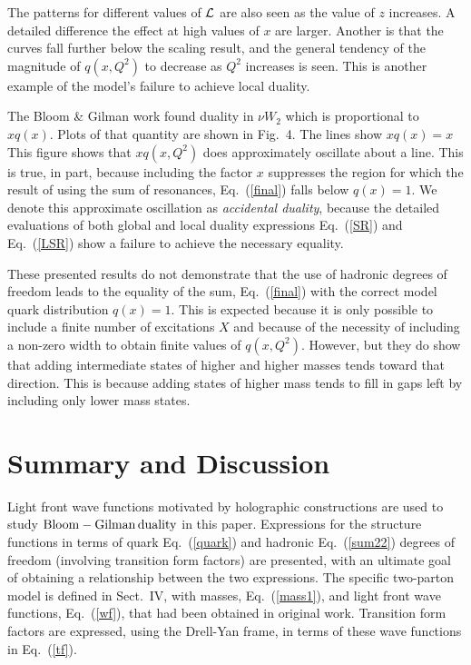 \documentclass[aps,prd,amsmath,longbibliography]{revtex4-1}
\newcommand{\eq}[1]{Eq.~(\ref{#1})}
\def\BGs{\rm Bloom-Gilman\,duality}
\begin{document}
{ The patterns for different values of ${\cal L}$ are  also seen as the value of $z$ increases. A detailed difference  the effect at high values of $x$ are larger. Another is that the curves fall further below the scaling result, and  the general tendency of the magnitude of $q(x,Q^2)$ to decrease as $Q^2$ increases is seen. This is another example of the model's failure to achieve local duality.

The  Bloom \& Gilman work found duality in $\nu W_2$ which is proportional to $xq(x)$. Plots of that quantity are shown in Fig.~4. The lines show $x q(x)=x $  This figure shows that $x q(x,Q^2)$ does approximately oscillate about a line. This is true, in part, because including  the factor $x$ suppresses the region for which the result of using the sum of resonances, \eq{final} falls below $q(x)=1$.
We denote this   approximate oscillation  as {\it accidental duality}, because the detailed evaluations of both global and local duality expressions \eq{SR} and \eq{LSR} show a failure to achieve the necessary equality.
 
These  presented results do not  demonstrate that the use of hadronic degrees of freedom leads  to the equality of the sum, \eq{final} with the correct model quark distribution $q(x)=1$. This is expected because it is only  possible to include a finite number of excitations $X$ and because of the necessity of including a non-zero width to obtain finite values of $q(x,Q^2)$.  However,  but they do show that adding intermediate states of higher and higher masses tends toward that direction. This is because adding  states of higher mass tends to fill in gaps left by including only lower mass states. 
% 
\section{Summary and Discussion}

Light front wave functions motivated by holographic constructions are used to study $\BGs$ in this paper.   Expressions for the structure functions  in terms of quark \eq{quark} and hadronic \eq{sum22} degrees of freedom (involving transition form factors) are presented, with an ultimate goal of obtaining a relationship between the two expressions. The specific two-parton model is defined in Sect.~IV, with masses, \eq{mass1},
 and light front wave functions,  \eq{wf},  that had been obtained in original work.  Transition form factors are expressed, using the Drell-Yan frame,  in terms of these wave functions in \eq{tf}.  
 
}
\end{document}
